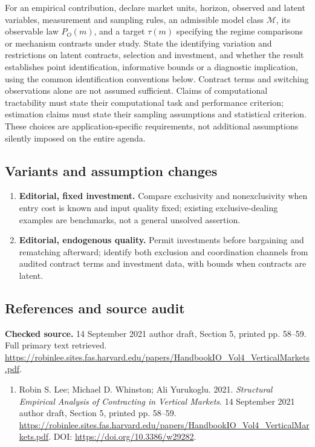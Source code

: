 \documentclass[11pt,a4paper]{article}
\begin{document}
For an empirical contribution, declare market units, horizon, observed and latent variables, measurement and sampling rules, an admissible model class \(\mathcal M\), its observable law \(P_O(m)\), and a target \(\tau(m)\) specifying the regime comparisons or mechanism contrasts under study. State the identifying variation and restrictions on latent contracts, selection and investment, and whether the result establishes point identification, informative bounds or a diagnostic implication, using the common identification conventions below. Contract terms and switching observations alone are not assumed sufficient. Claims of computational tractability must state their computational task and performance criterion; estimation claims must state their sampling assumptions and statistical criterion. These choices are application-specific requirements, not additional assumptions silently imposed on the entire agenda.
\subsection*{Variants and assumption changes}
\begin{enumerate}
\item \textbf{Editorial, fixed investment.} Compare exclusivity and nonexclusivity when entry cost is known and input quality fixed; existing exclusive-dealing examples are benchmarks, not a general unsolved assertion.
\item \textbf{Editorial, endogenous quality.} Permit investments before bargaining and rematching afterward; identify both exclusion and coordination channels from audited contract terms and investment data, with bounds when contracts are latent.
\end{enumerate}
\subsection*{References and source audit}
\textbf{Checked source.} 14 September 2021 author draft, Section 5, printed pp. 58--59. Full primary text retrieved. \url{https://robinlee.sites.fas.harvard.edu/papers/HandbookIO_Vol4_VerticalMarkets.pdf}.
\begin{enumerate}\raggedright
\item\hypertarget{definitions:source:30007681:1}{} Robin S. Lee; Michael D. Whinston; Ali Yurukoglu. 2021. \emph{Structural Empirical Analysis of Contracting in Vertical Markets}. 14 September 2021 author draft, Section 5, printed pp. 58--59.
\url{https://robinlee.sites.fas.harvard.edu/papers/HandbookIO_Vol4_VerticalMarkets.pdf}.
DOI: \url{https://doi.org/10.3386/w29282}.
\end{enumerate}
\end{document}
